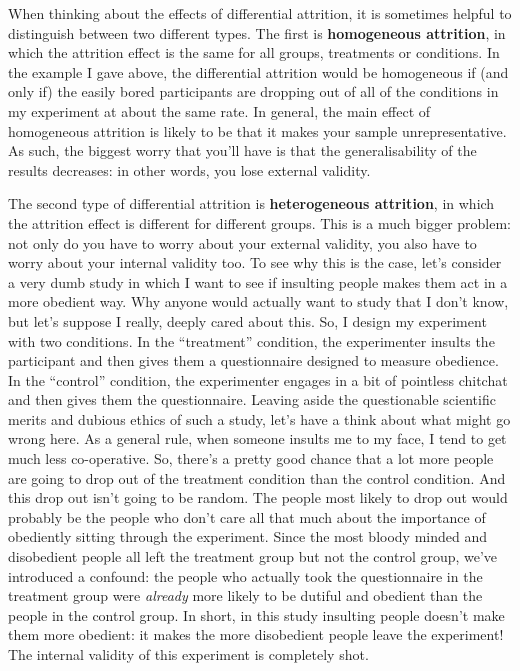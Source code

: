 \documentclass[
]{book}
\begin{document}
When thinking about the effects of differential attrition, it is sometimes helpful to distinguish between two different types. The first is \textbf{homogeneous attrition}, in which the attrition effect is the same for all groups, treatments or conditions. In the example I gave above, the differential attrition would be homogeneous if (and only if) the easily bored participants are dropping out of all of the conditions in my experiment at about the same rate. In general, the main effect of homogeneous attrition is likely to be that it makes your sample unrepresentative. As such, the biggest worry that you'll have is that the generalisability of the results decreases: in other words, you lose external validity.

The second type of differential attrition is \textbf{heterogeneous attrition}, in which the attrition effect is different for different groups. This is a much bigger problem: not only do you have to worry about your external validity, you also have to worry about your internal validity too. To see why this is the case, let's consider a very dumb study in which I want to see if insulting people makes them act in a more obedient way. Why anyone would actually want to study that I don't know, but let's suppose I really, deeply cared about this. So, I design my experiment with two conditions. In the ``treatment'' condition, the experimenter insults the participant and then gives them a questionnaire designed to measure obedience. In the ``control'' condition, the experimenter engages in a bit of pointless chitchat and then gives them the questionnaire. Leaving aside the questionable scientific merits and dubious ethics of such a study, let's have a think about what might go wrong here. As a general rule, when someone insults me to my face, I tend to get much less co-operative. So, there's a pretty good chance that a lot more people are going to drop out of the treatment condition than the control condition. And this drop out isn't going to be random. The people most likely to drop out would probably be the people who don't care all that much about the importance of obediently sitting through the experiment. Since the most bloody minded and disobedient people all left the treatment group but not the control group, we've introduced a confound: the people who actually took the questionnaire in the treatment group were {\emph{already}} more likely to be dutiful and obedient than the people in the control group. In short, in this study insulting people doesn't make them more obedient: it makes the more disobedient people leave the experiment! The internal validity of this experiment is completely shot.
\end{document}
